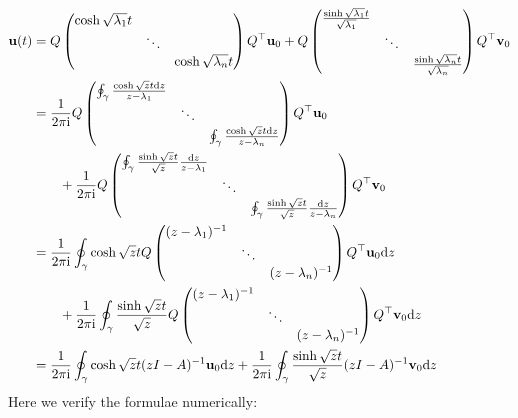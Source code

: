 \documentclass[12pt,a4paper]{article}
\def\D{ {\rm d} }
\def\I{ {\rm i} }
\def\vc#1{ {\mathbf #1} }
\def\dz{\D z}
\begin{document}
\begin{align*}
    \vc u(t) &= Q \begin{pmatrix} \cosh \sqrt{\lambda_1} t \\ & \ddots \\
                        && \cosh \sqrt{\lambda_n} t  \end{pmatrix}  Q^\top \vc u_0 +
                        Q \begin{pmatrix} {\sinh \sqrt{\lambda_1} t \over \sqrt{\lambda_1}}\\ & \ddots \\
                        && {\sinh \sqrt{\lambda_n} t \over \sqrt{\lambda_n}} \end{pmatrix}  Q^\top \vc v_0 \\
              &= {1 \over 2 \pi \I} Q \begin{pmatrix}  \oint_\gamma {\cosh \sqrt{z} t  \dz \over z - \lambda_1}\\ & \ddots \\
                        &&  \oint_\gamma {\cosh \sqrt{z} t  \dz \over z - \lambda_n}\end{pmatrix}  Q^\top \vc u_0 \\
& \qquad +
                        {1 \over 2 \pi \I} Q \begin{pmatrix} \oint_\gamma {\sinh \sqrt{z} t \over \sqrt z} {\dz   \over z - \lambda_1}  \\ & \ddots \\
                        && \oint_\gamma {\sinh \sqrt{z} t \over \sqrt z} {\dz   \over z - \lambda_n}  \end{pmatrix}  Q^\top \vc v_0 \\
&= {1 \over 2 \pi \I} \oint_\gamma \cosh \sqrt{z} t   Q \begin{pmatrix}  (z - \lambda_1)^{-1}\\ & \ddots \\
                        &&    (z - \lambda_n)^{-1}\end{pmatrix}  Q^\top \vc u_0 \dz \\
&\qquad +  {1 \over 2 \pi \I} \oint_\gamma {\sinh \sqrt{z} t \over \sqrt z}   Q \begin{pmatrix}  (z - \lambda_1)^{-1}\\ & \ddots \\
                        &&    (z - \lambda_n)^{-1}\end{pmatrix}  Q^\top \vc v_0 \dz \\
&= {1 \over 2 \pi \I} \oint_\gamma \cosh \sqrt{z} t  (z I - A)^{-1} \vc u_0 \dz +  {1 \over 2 \pi \I} \oint_\gamma {\sinh \sqrt{z} t \over \sqrt z}   (z I - A)^{-1} \vc v_0 \dz
\end{align*}
Here we verify the formulae numerically:
\end{document}
